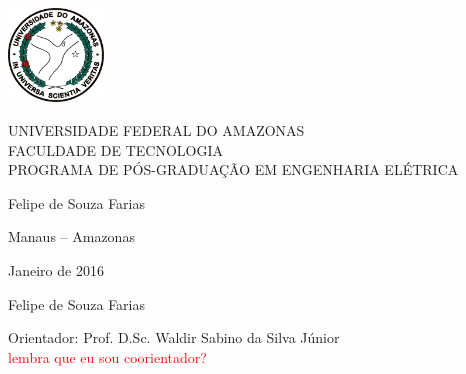 \begin{center}
\includegraphics[bb=0 0 646 638,height=2.5cm]{ufam.png}

\textsf{\large%
UNIVERSIDADE FEDERAL DO AMAZONAS\\
FACULDADE DE TECNOLOGIA\\
PROGRAMA DE P\'OS-GRADUA\c{C}\~AO EM ENGENHARIA ELÉTRICA}

\vspace*{4cm}
\tittese

\vspace*{4cm}


{\large Felipe de Souza Farias}


\vspace*{3cm}

Manaus -- Amazonas

Janeiro de 2016

\end{center}





\begin{center}
{\large Felipe de Souza Farias}




\vspace*{4cm}
\tittese
\vspace*{2cm}
\descrtese
\vspace*{2cm}


Orientador: Prof. D.Sc. Waldir Sabino da Silva Júnior\\
\textcolor{red}{lembra que eu sou coorientador?}



\end{center}

